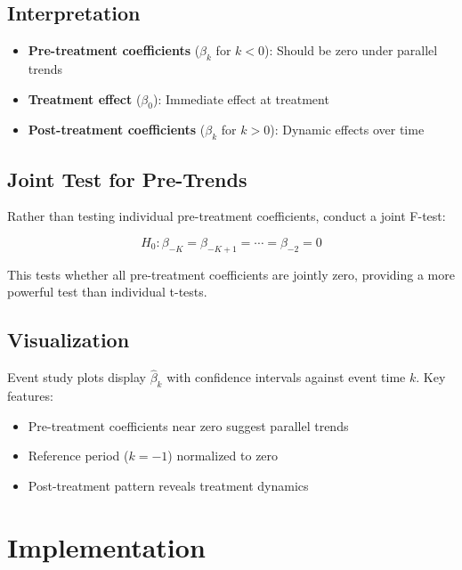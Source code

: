 \subsection{Interpretation}

\begin{itemize}
    \item \textbf{Pre-treatment coefficients} ($\beta_k$ for $k < 0$): Should be zero under parallel trends
    \item \textbf{Treatment effect} ($\beta_0$): Immediate effect at treatment
    \item \textbf{Post-treatment coefficients} ($\beta_k$ for $k > 0$): Dynamic effects over time
\end{itemize}

\subsection{Joint Test for Pre-Trends}

Rather than testing individual pre-treatment coefficients, conduct a joint F-test:

\begin{equation}
H_0: \beta_{-K} = \beta_{-K+1} = \cdots = \beta_{-2} = 0
\label{eq:pretrends_test}
\end{equation}

This tests whether all pre-treatment coefficients are jointly zero, providing a more powerful test than individual t-tests.

\subsection{Visualization}

Event study plots display $\hat{\beta}_k$ with confidence intervals against event time $k$. Key features:
\begin{itemize}
    \item Pre-treatment coefficients near zero suggest parallel trends
    \item Reference period ($k = -1$) normalized to zero
    \item Post-treatment pattern reveals treatment dynamics
\end{itemize}

\section{Implementation}
\label{sec:did_implementation}

